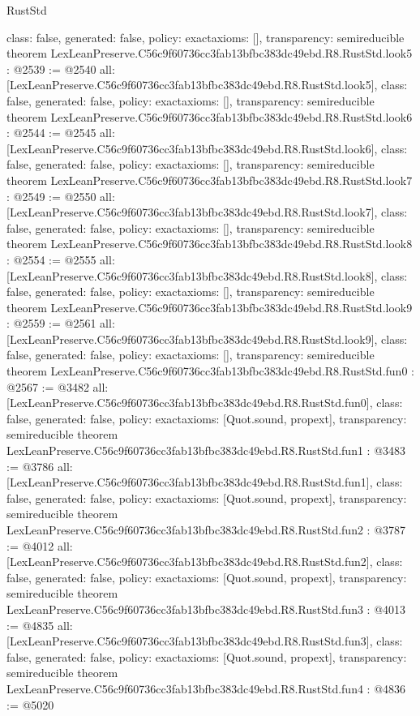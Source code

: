\begin{lexlean}{RustStd}
\begin{coremodule}
{  class: false,
  generated: false,
  policy: exact{axioms: []},
  transparency: semireducible
}
theorem LexLeanPreserve.C56c9f60736cc3fab13bfbc383dc49ebd.R8.RustStd.look5 : @2539 := @2540 {
  all: [LexLeanPreserve.C56c9f60736cc3fab13bfbc383dc49ebd.R8.RustStd.look5],
  class: false,
  generated: false,
  policy: exact{axioms: []},
  transparency: semireducible
}
theorem LexLeanPreserve.C56c9f60736cc3fab13bfbc383dc49ebd.R8.RustStd.look6 : @2544 := @2545 {
  all: [LexLeanPreserve.C56c9f60736cc3fab13bfbc383dc49ebd.R8.RustStd.look6],
  class: false,
  generated: false,
  policy: exact{axioms: []},
  transparency: semireducible
}
theorem LexLeanPreserve.C56c9f60736cc3fab13bfbc383dc49ebd.R8.RustStd.look7 : @2549 := @2550 {
  all: [LexLeanPreserve.C56c9f60736cc3fab13bfbc383dc49ebd.R8.RustStd.look7],
  class: false,
  generated: false,
  policy: exact{axioms: []},
  transparency: semireducible
}
theorem LexLeanPreserve.C56c9f60736cc3fab13bfbc383dc49ebd.R8.RustStd.look8 : @2554 := @2555 {
  all: [LexLeanPreserve.C56c9f60736cc3fab13bfbc383dc49ebd.R8.RustStd.look8],
  class: false,
  generated: false,
  policy: exact{axioms: []},
  transparency: semireducible
}
theorem LexLeanPreserve.C56c9f60736cc3fab13bfbc383dc49ebd.R8.RustStd.look9 : @2559 := @2561 {
  all: [LexLeanPreserve.C56c9f60736cc3fab13bfbc383dc49ebd.R8.RustStd.look9],
  class: false,
  generated: false,
  policy: exact{axioms: []},
  transparency: semireducible
}
theorem LexLeanPreserve.C56c9f60736cc3fab13bfbc383dc49ebd.R8.RustStd.fun0 : @2567 := @3482 {
  all: [LexLeanPreserve.C56c9f60736cc3fab13bfbc383dc49ebd.R8.RustStd.fun0],
  class: false,
  generated: false,
  policy: exact{axioms: [Quot.sound, propext]},
  transparency: semireducible
}
theorem LexLeanPreserve.C56c9f60736cc3fab13bfbc383dc49ebd.R8.RustStd.fun1 : @3483 := @3786 {
  all: [LexLeanPreserve.C56c9f60736cc3fab13bfbc383dc49ebd.R8.RustStd.fun1],
  class: false,
  generated: false,
  policy: exact{axioms: [Quot.sound, propext]},
  transparency: semireducible
}
theorem LexLeanPreserve.C56c9f60736cc3fab13bfbc383dc49ebd.R8.RustStd.fun2 : @3787 := @4012 {
  all: [LexLeanPreserve.C56c9f60736cc3fab13bfbc383dc49ebd.R8.RustStd.fun2],
  class: false,
  generated: false,
  policy: exact{axioms: [Quot.sound, propext]},
  transparency: semireducible
}
theorem LexLeanPreserve.C56c9f60736cc3fab13bfbc383dc49ebd.R8.RustStd.fun3 : @4013 := @4835 {
  all: [LexLeanPreserve.C56c9f60736cc3fab13bfbc383dc49ebd.R8.RustStd.fun3],
  class: false,
  generated: false,
  policy: exact{axioms: [Quot.sound, propext]},
  transparency: semireducible
}
theorem LexLeanPreserve.C56c9f60736cc3fab13bfbc383dc49ebd.R8.RustStd.fun4 : @4836 := @5020 {
}
\end{coremodule}
\end{lexlean}
